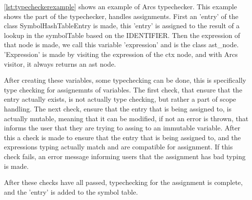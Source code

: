 \ref{lst:typecheckerexample} shows an example of Arcs typechecker. This example shows the part of the typechecker, handles assignments. First an 'entry' of the class SymbolHashTableEntry is made, this 'entry' is assigned to the result of a lookup in the symbolTable based on the IDENTIFIER. Then the expression of that node is made, we call this variable 'expression' and is the class \gls{ast}\_node. 'Expression' is made by visiting the expression of the ctx node, and with Arcs visitor, it always returns an \gls{ast} node.

After creating these variables, some typechecking can be done, this is specifically type checking for assignemnts of variables. The first check, that ensure that the entry actually exists, is not actually type checking, but rather a part of scope handling. The next check, ensure that the entry that is being assigned to, is actually mutable, meaning that it can be modified, if not an error is thrown, that informs the user that they are trying to assing to an immutable variable. After this a check is made to ensure that the entry that is being assigned to, and the expressions typing actually match and are compatible for assignment. If this check fails, an error message informing users that the assignment has bad typing is made.

After these checks have all passed, typechecking for the assignment is complete, and the 'entry' is added to the symbol table.



